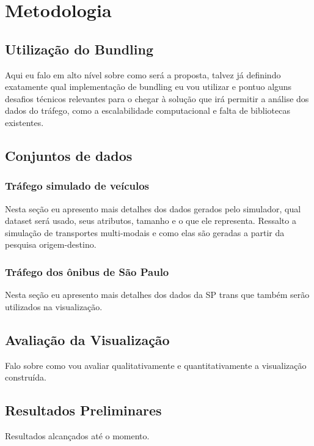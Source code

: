 \chapter{Metodologia}
\label{cap:visualizacao}

\section{Utilização do Bundling}
  Aqui eu falo em alto nível sobre como será a proposta, talvez já definindo exatamente
qual implementação de bundling eu vou utilizar e pontuo alguns desafios técnicos relevantes para o
chegar à solução que irá permitir a análise dos dados do tráfego, como a escalabilidade
computacional e falta de bibliotecas existentes.

\section{Conjuntos de dados}

\subsection{Tráfego simulado de veículos}
  Nesta seção eu apresento mais detalhes dos dados gerados pelo simulador, qual
dataset será usado, seus atributos, tamanho e o que ele representa. Ressalto
a simulação de transportes multi-modais e como elas são geradas a partir da pesquisa origem-destino.

\subsection{Tráfego dos ônibus de São Paulo}
  Nesta seção eu apresento mais detalhes dos dados da SP trans que também serão
utilizados na visualização. 

\section{Avaliação da Visualização}
  Falo sobre como vou avaliar qualitativamente e quantitativamente a visualização
construída. 

\section{Resultados Preliminares}

Resultados alcançados até o momento.


